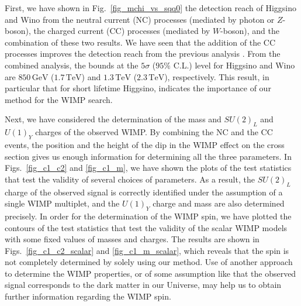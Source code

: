 \documentclass[12pt,twoside,book]{article}
\begin{document}
First, we have shown in Fig.~\ref{fig_mchi_vs_sqq0} the detection
reach of Higgsino and Wino from the neutral current (NC) processes
(mediated by photon or $Z$-boson), the charged current (CC) processes
(mediated by $W$-boson), and the combination of these two results.  We
have seen that the addition of the CC processes improves the detection
reach from the previous analysis \cite{Chigusa:2018vxz}.  From the
combined analysis, the bounds at the $5\sigma$ ($95\%$ C.L.) level for
Higgsino and Wino are $850\,\mathrm{GeV}$ ($1.7\,\mathrm{TeV}$) and
$1.3\,\mathrm{TeV}$ ($2.3\,\mathrm{TeV}$), respectively.  This result,
in particular that for short lifetime Higgsino, indicates the
importance of our method for the WIMP search.

Next, we have considered the determination of the mass and $SU(2)_L$
and $U(1)_Y$ charges of the observed WIMP.  By combining the NC and
the CC events, the position and the height of the dip in the WIMP
effect on the cross section gives us enough information for
determining all the three parameters.  In Figs.~\ref{fig_c1_c2} and
\ref{fig_c1_m}, we have shown the plots of the test statistics that
test the validity of several choices of parameters.  As a result, the
$SU(2)_L$ charge of the observed signal is correctly identified under
the assumption of a single WIMP multiplet, and the $U(1)_Y$ charge
and mass are also determined precisely.  In order for the
determination of the WIMP spin, we have plotted the contours of the
test statistics that test the validity of the scalar WIMP models with
some fixed values of masses and charges.  The results are shown in
Figs.~\ref{fig_c1_c2_scalar} and \ref{fig_c1_m_scalar}, which reveals
that the spin is not completely determined by solely using our
method.  Use of another approach to determine the WIMP properties, or
of some assumption like that the observed signal corresponds to the
dark matter in our Universe, may help us to obtain further information
regarding the WIMP spin.




\end{document}
